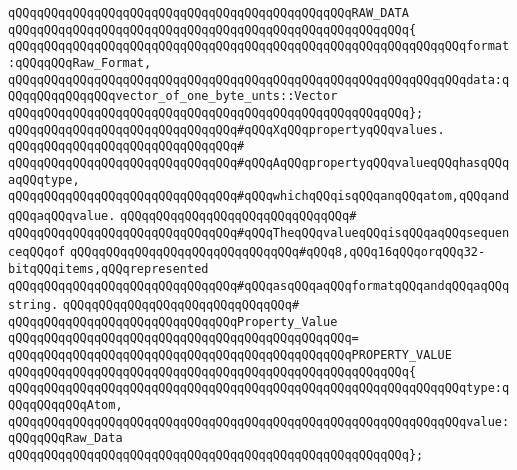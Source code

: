 \verb|qQQqqQQqqQQqqQQqqQQqqQQqqQQqqQQqqQQqqQQqqQQqqQQqRAW_DATA|\newline
\verb|qQQqqQQqqQQqqQQqqQQqqQQqqQQqqQQqqQQqqQQqqQQqqQQqqQQqqQQq{|\newline
\verb|qQQqqQQqqQQqqQQqqQQqqQQqqQQqqQQqqQQqqQQqqQQqqQQqqQQqqQQqqQQqqQQqformat:qQQqqQQqRaw_Format,|\newline
\verb|qQQqqQQqqQQqqQQqqQQqqQQqqQQqqQQqqQQqqQQqqQQqqQQqqQQqqQQqqQQqqQQqdata:qQQqqQQqqQQqqQQqvector_of_one_byte_unts::Vector|\newline
\verb|qQQqqQQqqQQqqQQqqQQqqQQqqQQqqQQqqQQqqQQqqQQqqQQqqQQqqQQq};|\newline
\newline
\verb|qQQqqQQqqQQqqQQqqQQqqQQqqQQqqQQq#qQQqXqQQqpropertyqQQqvalues.|\newline
\verb|qQQqqQQqqQQqqQQqqQQqqQQqqQQqqQQq#|\newline
\verb|qQQqqQQqqQQqqQQqqQQqqQQqqQQqqQQq#qQQqAqQQqpropertyqQQqvalueqQQqhasqQQqaqQQqtype,|\newline
\verb|qQQqqQQqqQQqqQQqqQQqqQQqqQQqqQQq#qQQqwhichqQQqisqQQqanqQQqatom,qQQqandqQQqaqQQqvalue.|\newline
\verb|qQQqqQQqqQQqqQQqqQQqqQQqqQQqqQQq#|\newline
\verb|qQQqqQQqqQQqqQQqqQQqqQQqqQQqqQQq#qQQqTheqQQqvalueqQQqisqQQqaqQQqsequenceqQQqof|\newline
\verb|qQQqqQQqqQQqqQQqqQQqqQQqqQQqqQQq#qQQq8,qQQq16qQQqorqQQq32-bitqQQqitems,qQQqrepresented|\newline
\verb|qQQqqQQqqQQqqQQqqQQqqQQqqQQqqQQq#qQQqasqQQqaqQQqformatqQQqandqQQqaqQQqstring.|\newline
\verb|qQQqqQQqqQQqqQQqqQQqqQQqqQQqqQQq#|\newline
\verb|qQQqqQQqqQQqqQQqqQQqqQQqqQQqqQQqProperty_Value|\newline
\verb|qQQqqQQqqQQqqQQqqQQqqQQqqQQqqQQqqQQqqQQqqQQqqQQq=|\newline
\verb|qQQqqQQqqQQqqQQqqQQqqQQqqQQqqQQqqQQqqQQqqQQqqQQqPROPERTY_VALUE|\newline
\verb|qQQqqQQqqQQqqQQqqQQqqQQqqQQqqQQqqQQqqQQqqQQqqQQqqQQqqQQq{|\newline
\verb|qQQqqQQqqQQqqQQqqQQqqQQqqQQqqQQqqQQqqQQqqQQqqQQqqQQqqQQqqQQqqQQqtype:qQQqqQQqqQQqAtom,|\newline
\verb|qQQqqQQqqQQqqQQqqQQqqQQqqQQqqQQqqQQqqQQqqQQqqQQqqQQqqQQqqQQqqQQqvalue:qQQqqQQqRaw_Data|\newline
\verb|qQQqqQQqqQQqqQQqqQQqqQQqqQQqqQQqqQQqqQQqqQQqqQQqqQQqqQQq};|\newline
